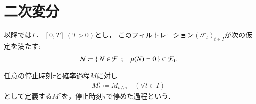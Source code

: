 \section{二次変分}
	以降では$I \coloneqq [0,T]\ (T>0)$とし，
	このフィルトレーション$(\mathcal{F}_t)_{t \in I}$が次の仮定を満たす:
	\begin{align}
		\mathcal{N} \coloneqq \left\{\ N \in \mathcal{F}\ \, ; \quad \mu(N) = 0\ \right\}
		\subset \mathcal{F}_0.
	\end{align}
	
	\begin{screen}
		\begin{dfn}[停止時刻で停めた過程]
			任意の停止時刻$\tau$と確率過程$M$に対し
			\begin{align}
				M^\tau_t \coloneqq M_{t \wedge \tau}
				\quad (\forall t \in I)
			\end{align}
			として定義する$M^\tau$を，停止時刻$\tau$で停めた過程という．
		\end{dfn}
	\end{screen}
	

